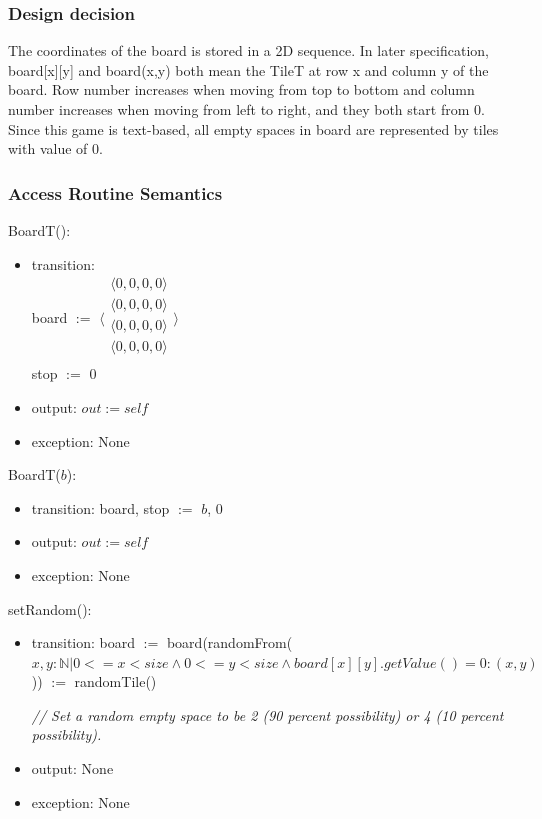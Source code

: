 \documentclass[12pt]{article}
\begin{document}
\subsubsection* {Design decision}

The coordinates of the board is stored in a 2D sequence. In later specification, board[x][y] and board(x,y) both mean the TileT at row x and column y of the board. Row number increases when moving from top to bottom and column number increases when moving from left to right, and they both start from 0. Since this game is text-based, all empty spaces in board are represented by tiles with value of 0.

\subsubsection* {Access Routine Semantics}

BoardT():
\begin{itemize}
\item transition: \\
      board $:=$ 
      $\langle \begin{array}{c}
      \langle 0, 0, 0, 0 \rangle\\
      \langle 0, 0, 0, 0 \rangle\\
      \langle 0, 0, 0, 0 \rangle\\
      \langle 0, 0, 0, 0 \rangle\\
      \end{array} \rangle$ \\ 
      stop $:=$ 0
\item output: $out := \mathit{self}$
\item exception: None
\end{itemize}

\noindent BoardT($b$):
\begin{itemize}
\item transition: board, stop $:=$ $b$, 0
\item output: $out := \mathit{self}$
\item exception: None
\end{itemize}

\noindent setRandom():
\begin{itemize}
\item transition: board $:=$ board(randomFrom($x, y : \mathbb{N}| 0 <= x < size \land 0 <= y < size \land board[x][y].getValue() = 0: (x, y)$)) $:=$ randomTile()

\textit{// Set a random empty space to be 2 (90 percent possibility) or 4 (10 percent possibility).}
\item output: None
\item exception: None
\end{itemize}
\end{document}
